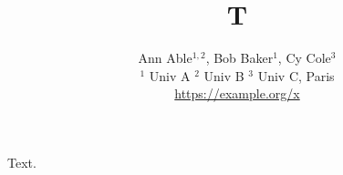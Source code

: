 \documentclass{article}
\begin{document}
\title{T}
\author{Ann Able$^{1,2}$, Bob Baker$^{1}$, Cy Cole$^{3}$ \\
\small {$^1$} Univ A
{$^2$} Univ B
{$^3$} Univ C, Paris \\
\small \url{https://example.org/x}}
\maketitle
Text.
\end{document}
